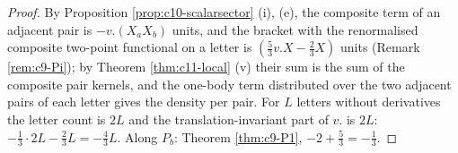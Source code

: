 \begin{proof}
By Proposition \ref{prop:c10-scalarsector} (i), (e), the composite term of an adjacent pair is $-v.(X_aX_b)$ units, and the bracket with the renormalised composite two-point functional on a letter is $(\tfrac53v.X-\tfrac23X)$ units (Remark \ref{rem:c9-Pi}); by Theorem \ref{thm:c11-local} (v) their sum is the sum of the composite pair kernels, and the one-body term distributed over the two adjacent pairs of each letter gives the density per pair. For $L$ letters without derivatives the letter count is $2L$ and the translation-invariant part of $v.$ is $2L$: $-\tfrac13\cdot2L-\tfrac23L=-\tfrac43L$. Along $P_b$: Theorem \ref{thm:c9-P1}, $-2+\tfrac53=-\tfrac13$.
\end{proof}


